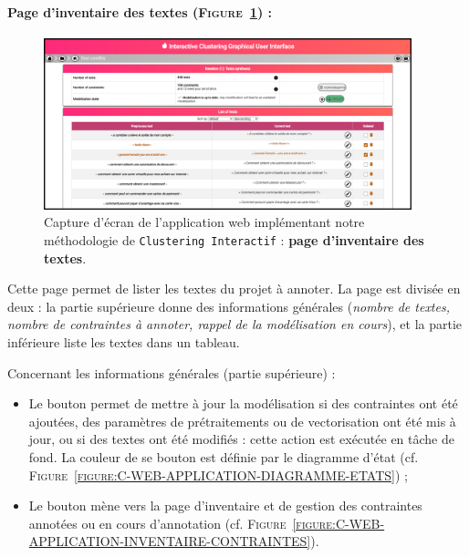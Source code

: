 	
	\newpage
	\paragraph{Page d'inventaire des textes (\textsc{Figure~\ref{figure:C-WEB-APPLICATION-INVENTAIRE-TEXTES}}) :}
	
		\begin{figure}[H]
			\centering
			\includegraphics[width=0.95\textwidth]{figures/interactive-clustering-application-textes}
			\caption{
				Capture d'écran de l'application web implémentant notre méthodologie de \texttt{Clustering Interactif} : \textbf{page d'inventaire des textes}.
			}
			\label{figure:C-WEB-APPLICATION-INVENTAIRE-TEXTES}
		\end{figure}
		
		Cette page permet de lister les textes du projet à annoter.
		La page est divisée en deux : la partie supérieure donne des informations générales (\textit{nombre de textes, nombre de contraintes à annoter, rappel de la modélisation en cours}), et la partie inférieure liste les textes dans un tableau.
		
		Concernant les informations générales (partie supérieure) :
		\begin{itemize}
			\item Le bouton  permet de mettre à jour la modélisation si des contraintes ont été ajoutées, des paramètres de prétraitements ou de vectorisation ont été mis à jour, ou si des textes ont été modifiés : cette action est exécutée en tâche de fond.
			La couleur de se bouton est définie par le diagramme d'état (cf. \textsc{Figure~\ref{figure:C-WEB-APPLICATION-DIAGRAMME-ETATS}}) ;
			\item Le bouton  mène vers la page d'inventaire et de gestion des contraintes annotées ou en cours d'annotation (cf. \textsc{Figure~\ref{figure:C-WEB-APPLICATION-INVENTAIRE-CONTRAINTES}}).
		\end{itemize}
		
